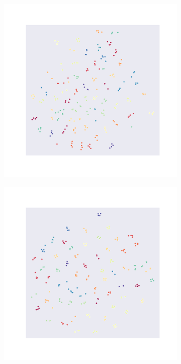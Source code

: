 \begin{figure}[h]
     \centering
     \begin{subfigure}[b]{0.4\textwidth}
         \centering
         \includegraphics[width=\textwidth,trim=2.55cm 3cm 2.6cm 2.6cm, clip]{chapters/assets/samptr_extra/cnn_emb.pdf}
     \end{subfigure}
     \hspace{1cm}
     \begin{subfigure}[b]{0.4\textwidth}
         \centering
         \includegraphics[width=\textwidth, trim=2.55cm 3cm 2.6cm 2.6cm, clip]{chapters/assets/samptr_extra/gnn_emb.pdf}

\end{subfigure}
\end{figure}
